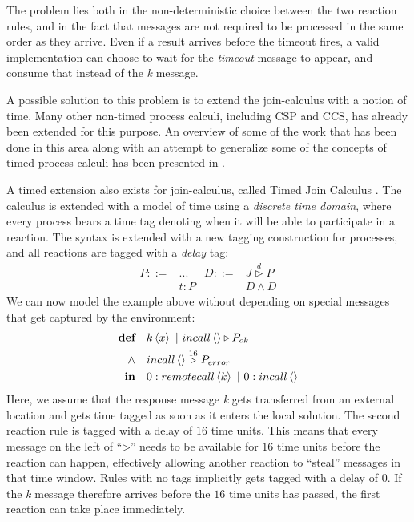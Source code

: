 The problem lies both in the non-deterministic choice between the two
reaction rules, and in the fact that messages are not required to be
processed in the same order as they arrive. Even if a result arrives
before the timeout fires, a valid implementation can choose to wait
for the \emph{timeout} message to appear, and consume that instead of
the \emph{k} message.

A possible solution to this problem is to extend the join-calculus
with a notion of time. Many other non-timed process calculi, including
CSP and CCS, has already been extended for this purpose. An overview
of some of the work that has been done in this area along with an
attempt to generalize some of the concepts of timed process calculi
has been presented in \cite{nicollin-overview}.

A timed extension also exists for join-calculus, called Timed Join
Calculus \cite{timed-join}. The calculus is extended with a model of
time using a \emph{discrete time domain}, where every process bears a
time tag denoting when it will be able to participate in a reaction.
The syntax is extended with a new tagging construction for processes,
and all reactions are tagged with a
\emph{delay} tag:
\begin{align*}
  P ::={} & ...    & D ::={}& J \stackrel{d}{\triangleright} P \\
          & t : P  &        & D \land D
\end{align*}
We can now model the example above without depending on special
messages that get captured by the environment:
\begin{align*}
  \textbf{def}\quad & \atm k<x> ~|~ \atm incall<> \triangleright P_{ok} \\
  \land\quad & \atm incall<> \stackrel{16}{\triangleright} P_{error} \\
  \textbf{in}\quad & \atm 0:remotecall<k> ~|~ \atm 0:incall<>
\end{align*}
Here, we assume that the response message \emph{k} gets transferred
from an external location and gets time tagged as soon as it enters
the local solution.  The second reaction rule is tagged with a delay
of $16$ time units.  This means that every message on the left of
``$\triangleright$'' needs to be available for $16$ time units before
the reaction can happen, effectively allowing another reaction to
``steal'' messages in that time window. Rules with no tags implicitly
gets tagged with a delay of $0$. If the \emph{k} message therefore
arrives before the $16$ time units has passed, the first reaction can
take place immediately.


